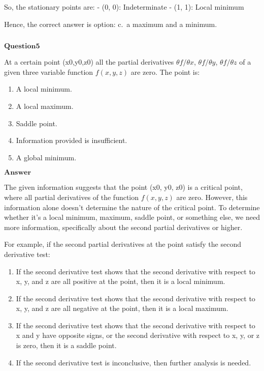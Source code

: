 \documentclass[11pt]{article}
\makeatletter
\providecommand{\tightlist}{%
      \setlength{\itemsep}{0pt}\setlength{\parskip}{0pt}}
\newcommand{\boxspacing}{\kern\kvtcb@left@rule\kern\kvtcb@boxsep}
\newcommand{\prompt}[4]{
        {\ttfamily\llap{{\color{#2}[#3]:\hspace{3pt}#4}}\vspace{-\baselineskip}}
    }
\makeatother
\begin{document}
So, the stationary points are: - (0, 0): Indeterminate - (1, 1): Local
minimum

Hence, the correct answer is option: c.~a maximum and a minimum.

    \begin{tcolorbox}[breakable, size=fbox, boxrule=1pt, pad at break*=1mm,colback=cellbackground, colframe=cellborder]
\prompt{In}{incolor}{ }{\boxspacing}
\begin{Verbatim}[commandchars=\\\{\}]

\end{Verbatim}
\end{tcolorbox}

    $\textbf{Question5}$

At a certain point (x0,y0,z0) all the partial derivatives $θf/θx$, $θf/θy$, $θf/θz$ of a given three variable function $f(x,y,z)$ are zero. The point
is:

\begin{enumerate}
\def\labelenumi{\alph{enumi}.}
\item
  A local minimum.
\item
  A local maximum.
\item
  Saddle point.
\item
  Information provided is insufficient.
\item
  A global minimum.
\end{enumerate}

$\textbf{Answer}$

    The given information suggests that the point (x0, y0, z0) is a critical
point, where all partial derivatives of the function $ f(x, y, z) $
are zero. However, this information alone doesn't determine the nature
of the critical point. To determine whether it's a local minimum,
maximum, saddle point, or something else, we need more information,
specifically about the second partial derivatives or higher.

For example, if the second partial derivatives at the point satisfy the
second derivative test:

\begin{enumerate}
\def\labelenumi{\arabic{enumi}.}
\tightlist
\item
  If the second derivative test shows that the second derivative with
  respect to x, y, and z are all positive at the point, then it is a
  local minimum.
\item
  If the second derivative test shows that the second derivative with
  respect to x, y, and z are all negative at the point, then it is a
  local maximum.
\item
  If the second derivative test shows that the second derivative with
  respect to x and y have opposite signs, or the second derivative with
  respect to x, y, or z is zero, then it is a saddle point.
\item
  If the second derivative test is inconclusive, then further analysis
  is needed.
\end{enumerate}
\end{document}

